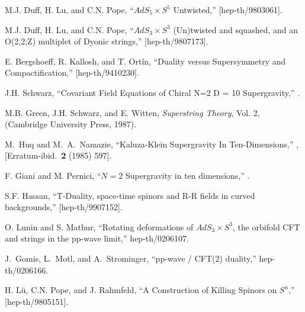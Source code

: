 \documentclass[a4paper,12pt]{article}
\begin{document}
\begin{thebibliography}{99}
 M.J. Duff, H. Lu, and C.N. Pope, ``$AdS_5\times S^5$ Untwisted,''  [hep-th/9803061].

  M.J. Duff, H. Lu, and C.N. Pope, ``$AdS_3 \times S^3$ (Un)twisted and squashed, and an O(2,2;Z) multiplet of Dyonic strings,''  [hep-th/9807173].

 E. Bergshoeff, R. Kallosh, and T. Ort\'{i}n, ``Duality versus Supersymmetry and Compactification,''  [hep-th/9410230].


 J.H. Schwarz, ``Covariant Field Equations of Chiral N=2 D = 10 Supergravity,'' .

 M.B. Green, J.H. Schwarz, and E. Witten, {\it Superstring Theory}, Vol. 2, (Cambridge University Press, 1987).


M.~Huq and M.~A.~Namazie,
``Kaluza-Klein Supergravity In Ten-Dimensions,'' ,
[Erratum-ibid.\  {\bf 2} (1985) 597].

 F. Giani and M. Pernici, ``$N=2$ Supergravity in ten dimensions,'' .

 S.F. Hassan, ``T-Duality, space-time spinors and R-R fields in curved backgrounds,''  [hep-th/9907152].

 O. Lunin and S. Mathur, ``Rotating deformations of $AdS_3\times S^3$, the orbifold CFT and strings in the pp-wave limit,'' hep-th/0206107.

 J.~Gomis, L.~Motl, and A.~Strominger, ``pp-wave / CFT(2) duality,'' hep-th/0206166.

 H. L\"{u}, C.N. Pope, and J. Rahmfeld, ``A Construction of Killing Spinors on $S^n$,''  [hep-th/9805151].


\end{thebibliography}
\end{document}
